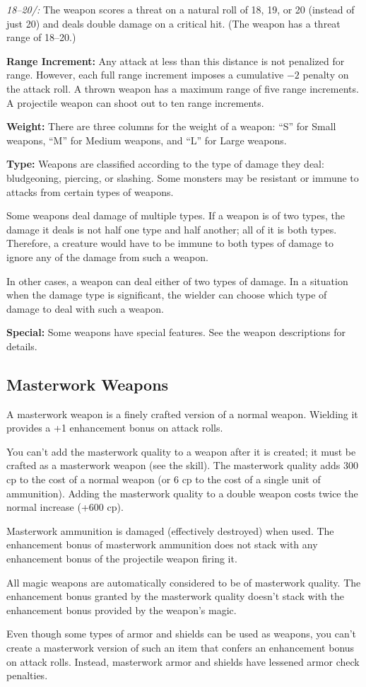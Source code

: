 \textit{18--20/:} The weapon scores a threat on a natural roll of 18, 19, or 20 (instead of just 20) and deals double damage on a critical hit. (The weapon has a threat range of 18--20.)

\textbf{Range Increment:} Any attack at less than this distance is not penalized for range. However, each full range increment imposes a cumulative $-2$ penalty on the attack roll. A thrown weapon has a maximum range of five range increments. A projectile weapon can shoot out to ten range increments.

\textbf{Weight:} There are three columns for the weight of a weapon: ``S'' for Small weapons, ``M'' for Medium weapons, and ``L'' for Large weapons.

\textbf{Type:} Weapons are classified according to the type of damage they deal: bludgeoning, piercing, or slashing. Some monsters may be resistant or immune to attacks from certain types of weapons.

Some weapons deal damage of multiple types. If a weapon is of two types, the damage it deals is not half one type and half another; all of it is both types. Therefore, a creature would have to be immune to both types of damage to ignore any of the damage from such a weapon.

In other cases, a weapon can deal either of two types of damage. In a situation when the damage type is significant, the wielder can choose which type of damage to deal with such a weapon.

\textbf{Special:} Some weapons have special features. See the weapon descriptions for details.



\subsection{Masterwork Weapons}
A masterwork weapon is a finely crafted version of a normal weapon. Wielding it provides a +1 enhancement bonus on attack rolls.

You can't add the masterwork quality to a weapon after it is created; it must be crafted as a masterwork weapon (see the  skill). The masterwork quality adds 300 cp to the cost of a normal weapon (or 6 cp to the cost of a single unit of ammunition). Adding the masterwork quality to a double weapon costs twice the normal increase (+600 cp).

Masterwork ammunition is damaged (effectively destroyed) when used. The enhancement bonus of masterwork ammunition does not stack with any enhancement bonus of the projectile weapon firing it.

All magic weapons are automatically considered to be of masterwork quality. The enhancement bonus granted by the masterwork quality doesn't stack with the enhancement bonus provided by the weapon's magic.

Even though some types of armor and shields can be used as weapons, you can't create a masterwork version of such an item that confers an enhancement bonus on attack rolls. Instead, masterwork armor and shields have lessened armor check penalties.
